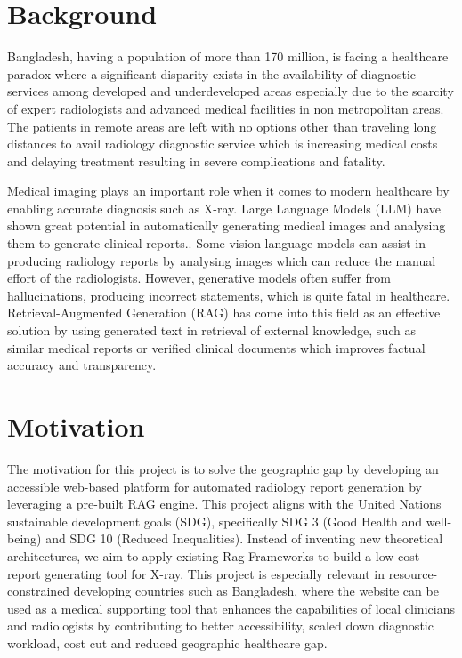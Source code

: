 \section{Background } 
 Bangladesh, having a population of more than 170 million, is facing a healthcare paradox where a significant disparity exists in the availability of diagnostic services among developed and underdeveloped areas especially due to the scarcity of expert radiologists and advanced medical facilities in non metropolitan areas. The patients in remote areas are left with no options other than traveling long distances to avail radiology diagnostic service which is increasing medical costs and delaying treatment resulting in severe complications and fatality.  

Medical imaging plays an important role when it comes to modern healthcare by enabling accurate diagnosis such as X-ray. Large Language Models (LLM) have shown great potential in automatically generating medical images and analysing them to generate clinical reports.\cite{Gu2021,Singhal2022}. Some vision language models can assist in producing radiology reports by analysing images which can reduce the manual effort of the radiologists. However, generative models often suffer from hallucinations, producing incorrect statements, which is quite fatal in healthcare. Retrieval-Augmented Generation (RAG) has come into this field as an effective solution by using generated text in retrieval of external knowledge, such as similar medical reports or verified clinical documents which improves factual accuracy and transparency.\cite{Jeong2024,Lewis2020}

\section{Motivation}
The motivation for this project is to solve the geographic gap by developing an accessible web-based platform for automated radiology report generation by leveraging a pre-built RAG engine. This project aligns with the United Nations sustainable development goals (SDG), specifically SDG 3 (Good Health and well-being) and SDG 10 (Reduced Inequalities). Instead of inventing new theoretical architectures, we aim to apply existing Rag Frameworks to build a low-cost report generating tool for X-ray. This project is especially relevant in resource-constrained developing countries such as Bangladesh, where the website can be used as a medical supporting tool that enhances the capabilities of local clinicians and radiologists by contributing to better accessibility, scaled down diagnostic workload, cost cut and reduced geographic healthcare gap.

